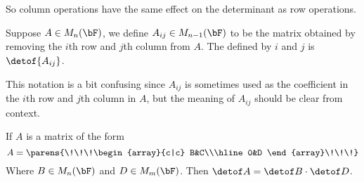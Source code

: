 So column operations have the same effect on the determinant as row operations.

\begin{defn*}

    Suppose $A\in M_n(\bF)$, we define $A_{ij}\in M_{n-1}(\bF)$ to be the matrix obtained by removing the $i$th row and $j$th column from $A$.
    The  defined by $i$ and $j$ is $\detof{A_{ij}}$.

\end{defn*}

This notation is a bit confusing since $A_{ij}$ is sometimes used as the coefficient in the $i$th row and $j$th column in $A$, but the meaning of $A_{ij}$ should be clear from context.

\begin{lemm*}[blockMatrixDeterminant]

    If $A$ is a matrix of the form
    \[ A = \parens{\!\!\!\begin{array}{c|c} B&C\\\hline0&D \end{array}\!\!\!} \]
    Where $B\in M_n(\bF)$ and $D\in M_m(\bF)$.
    Then $\detof A=\detof B\cdot\detof D$.

\end{lemm*}

